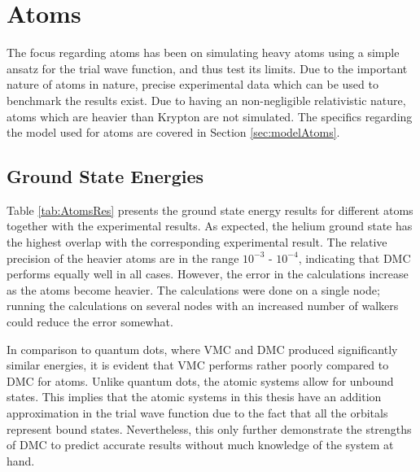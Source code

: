 \section{Atoms}
 
 The focus regarding atoms has been on simulating heavy atoms using a simple ansatz for the trial wave function, and thus test its limits. Due to the important nature of atoms in nature, precise experimental data which can be used to benchmark the results exist. Due to having an non-negligible relativistic nature, atoms which are heavier than Krypton are not simulated. The specifics regarding the model used for atoms are covered in Section \ref{sec:modelAtoms}.
 
\subsection{Ground State Energies}
 
 Table \ref{tab:AtomsRes} presents the ground state energy results for different atoms together with the experimental results. As expected, the helium ground state has the highest overlap with the corresponding experimental result. The relative precision of the heavier atoms are in the range $10^{-3}$ - $10^{-4}$, indicating that DMC performs equally well in all cases. However, the error in the calculations increase as the atoms become heavier. The calculations were done on a single node; running the calculations on several nodes with an increased number of walkers could reduce the error somewhat. 
 
 In comparison to quantum dots, where VMC and DMC produced significantly similar energies, it is evident that VMC performs rather poorly compared to DMC for atoms. Unlike quantum dots, the atomic systems allow for unbound states. This implies that the atomic systems in this thesis have an addition approximation in the trial wave function due to the fact that all the orbitals represent bound states. Nevertheless, this only further demonstrate the strengths of DMC to predict accurate results without much knowledge of the system at hand.
 
